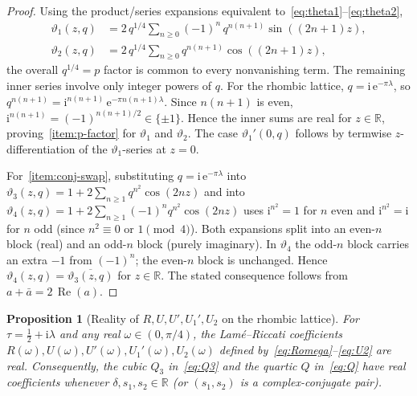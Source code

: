 \documentclass[11pt,a4paper]{article}
\theoremstyle{plain}
\newtheorem{proposition}[theorem]{Proposition}
\theoremstyle{definition}
\theoremstyle{remark}
\DeclareMathOperator{\Real}{Re}
\newcommand{\vt}[1]{\vartheta_{#1}}     %
\newcommand{\RR}{\mathbb{R}}
\newcommand{\ee}{\mathrm{e}}
\newcommand{\ii}{\mathrm{i}}
\begin{document}
\begin{proof}
Using the product/series expansions equivalent
to~\eqref{eq:theta1}--\eqref{eq:theta2},
\begin{align*}
  \vt{1}(z,q) &= 2\,q^{1/4}\sum_{n\ge 0}(-1)^n\,q^{n(n+1)}\sin((2n+1)z),\\
  \vt{2}(z,q) &= 2\,q^{1/4}\sum_{n\ge 0}q^{n(n+1)}\cos((2n+1)z),
\end{align*}
the overall $q^{1/4} = p$ factor is common to every nonvanishing term.
The remaining inner series involve only integer powers of $q$. For
the rhombic lattice, $q = \ii\,\ee^{-\pi\lambda}$, so
$q^{n(n+1)} = \ii^{n(n+1)}\,\ee^{-\pi n(n+1)\lambda}$. Since $n(n+1)$
is even, $\ii^{n(n+1)} = (-1)^{n(n+1)/2} \in \{\pm 1\}$. Hence the
inner sums are real for $z \in \RR$, proving~\ref{item:p-factor} for
$\vt{1}$ and $\vt{2}$. The case $\vt{1}'(0,q)$ follows by termwise
$z$-differentiation of the $\vt{1}$-series at $z=0$.

For~\ref{item:conj-swap}, substituting $q = \ii\,\ee^{-\pi\lambda}$
into $\vt{3}(z,q) = 1 + 2\sum_{n\ge 1} q^{n^2}\cos(2nz)$ and into
$\vt{4}(z,q) = 1 + 2\sum_{n\ge 1}(-1)^n q^{n^2}\cos(2nz)$ uses
$\ii^{n^2} = 1$ for $n$ even and $\ii^{n^2} = \ii$ for $n$ odd
(since $n^2 \equiv 0$ or $1 \pmod 4$). Both expansions split into
an even-$n$ block (real) and an odd-$n$ block (purely imaginary).
In $\vt{4}$ the odd-$n$ block carries an extra $-1$ from $(-1)^n$;
the even-$n$ block is unchanged. Hence
$\vt{4}(z,q) = \overline{\vt{3}(z,q)}$ for $z \in \RR$. The
stated consequence follows from $a + \bar a = 2\,\Real(a)$.
\end{proof}

\begin{proposition}[Reality of $R, U, U', U_1', U_2$ on the rhombic
lattice]\label{prop:spectral-reality}
For $\tau = \tfrac12 + \ii\lambda$ and any real $\omega \in (0,\pi/4)$,
the Lam\'e--Riccati coefficients
$R(\omega), U(\omega), U'(\omega), U_1'(\omega), U_2(\omega)$
defined by~\eqref{eq:Romega}--\eqref{eq:U2} are real. Consequently,
the cubic $Q_3$ in~\eqref{eq:Q3} and the quartic $Q$ in~\eqref{eq:Q}
have real coefficients whenever $\delta, s_1, s_2 \in \RR$ (or
$(s_1,s_2)$ is a complex-conjugate pair).
\end{proposition}
\end{document}
